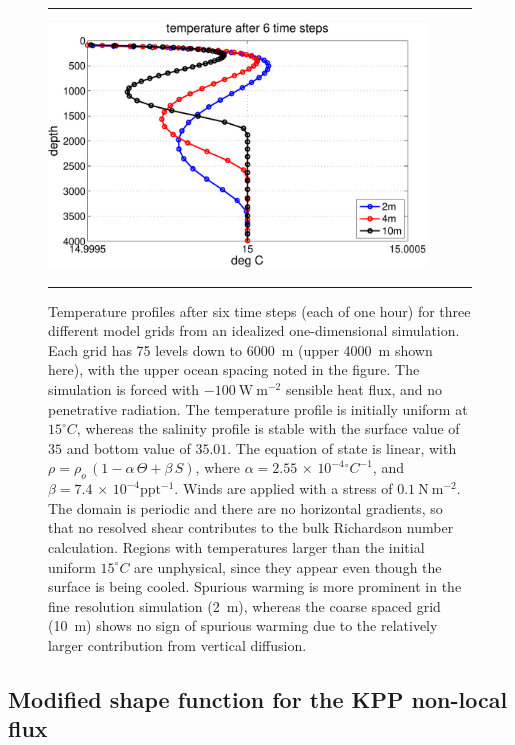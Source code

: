 \begin{figure}[h!t]
\rule{\textwidth}{0.005in}
\begin{center}
\includegraphics[angle=0,width=10cm]{./figs/KPP_temperature_test.pdf}
\caption[KPP temperature test]{\sf Temperature profiles after six time
  steps (each of one hour) for three different model grids from an
  idealized one-dimensional simulation.  Each grid has 75 levels down
  to 6000~m (upper 4000~m shown here), with the upper ocean spacing
  noted in the figure. The simulation is forced with
  $-100~\mbox{W}~\mbox{m}^{-2}$ sensible heat flux, and no penetrative
  radiation.  The temperature profile is initially uniform at
  $15^{\circ}C$, whereas the salinity profile is stable with the
  surface value of $35$ and bottom value of $35.01$.  The equation of
  state is linear, with $\rho = \rho_{o} \, (1 - \alpha \, \Theta +
  \beta \, S)$, where $\alpha = 2.55 \, \times \,
  10^{-4}\mbox{}^{\circ}C^{-1}$, and $\beta = 7.4 \, \times \,
  10^{-4}\mbox{ppt}^{-1}$.  Winds are applied with a stress of
  $0.1~\mbox{N}~\mbox{m}^{-2}$.  The domain is periodic and there are
  no horizontal gradients, so that no resolved shear contributes to
  the bulk Richardson number calculation.  Regions with temperatures
  larger than the initial uniform $15^{\circ}C$ are unphysical, since
  they appear even though the surface is being cooled.  Spurious
  warming is more prominent in the fine resolution simulation (2~m),
  whereas the coarse spaced grid (10~m) shows no sign of spurious
  warming due to the relatively larger contribution from vertical
  diffusion.}
\label{fig:KPP_temperature_test}
\end{center}
\rule{\textwidth}{0.005in}
\end{figure}


\subsection{Modified shape function for the KPP non-local flux}
\label{subsection:modified-kpp-structure}

